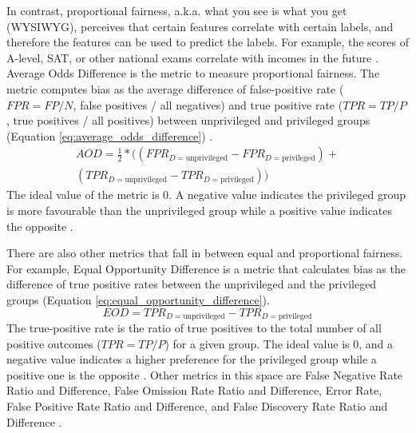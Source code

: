 \documentclass[sigconf,review]{acmart}
\begin{document}
	In contrast, proportional fairness, a.k.a. what you see is what you get (WYSIWYG),  perceives that certain features correlate with certain labels, and therefore the features can be used to predict the labels. For example, the scores of A-level, SAT, or other national exams correlate with incomes in the future \cite{mahoney2020ai,ibmaif3602022guidance}. Average Odds Difference is the metric to measure proportional fairness. The metric computes bias as the average difference of false-positive rate ($FPR = FP/N$, false positives / all negatives) and true positive rate ($TPR = TP/P$, true positives / all positives) between unprivileged and privileged groups (Equation \ref{eq:average_odds_difference}) \cite{ibmaif3602022doc,bellamy2018ai}.
	\begin{equation} \label{eq:average_odds_difference}
		\begin{aligned}
			AOD = \tfrac{1}{2}* ((FPR_{D = \text{unprivileged}} - FPR_{D = \text{privileged}}) +\\
			(TPR_{D = \text{unprivileged}} - TPR_{D = \text{privileged}}))
		\end{aligned}
	\end{equation}
	The ideal value of the metric is 0. A negative value indicates the privileged group is more favourable than the unprivileged group while a positive value indicates the opposite \cite{ibmaif3602022doc,bellamy2018ai}. 
	
	There are also other metrics that fall in between equal and proportional fairness. For example, Equal Opportunity Difference \cite{ibmaif3602022doc,bellamy2018ai} is a metric that calculates bias as the difference of true positive rates between the unprivileged and the privileged groups (Equation \ref{eq:equal_opportunity_difference}). 
	\begin{equation} \label{eq:equal_opportunity_difference}
		EOD = TPR_{D = \text{unprivileged}} - TPR_{D = \text{privileged}}	
	\end{equation}
	The true-positive rate is the ratio of true positives to the total number of all positive outcomes ($TPR=TP/P$) for a given group. The ideal value is 0, and a negative value indicates a higher preference for the privileged group while a positive one is the opposite \cite{ibmaif3602022doc,bellamy2018ai}. Other metrics in this space are False Negative Rate Ratio and Difference, False Omission Rate Ratio and Difference, Error Rate, False Positive Rate Ratio and Difference, and False Discovery Rate Ratio and Difference \cite{mahoney2020ai,ibmaif3602022guidance}.
	
\end{document}
